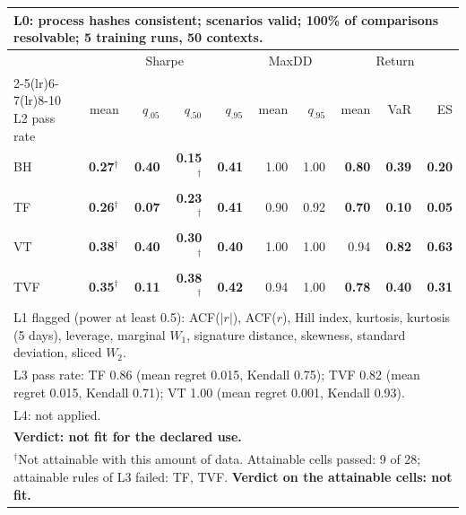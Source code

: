\begin{tabular}{lrrrrrrrrr}
\toprule
\multicolumn{10}{p{13.5cm}}{L0: process hashes consistent; scenarios valid; 100\% of comparisons resolvable; 5 training runs, 50 contexts.} \\
\midrule
 & \multicolumn{4}{c}{Sharpe} & \multicolumn{2}{c}{MaxDD} & \multicolumn{3}{c}{Return} \\
\cmidrule(lr){2-5}\cmidrule(lr){6-7}\cmidrule(lr){8-10}
L2 pass rate & mean & $q_{.05}$ & $q_{.50}$ & $q_{.95}$ & mean & $q_{.95}$ & mean & VaR & ES \\
\midrule
BH & \textbf{0.27}$^{\dagger}$ & \textbf{0.40} & \textbf{0.15}$^{\dagger}$ & \textbf{0.41} & 1.00 & 1.00 & \textbf{0.80} & \textbf{0.39} & \textbf{0.20} \\
TF & \textbf{0.26}$^{\dagger}$ & \textbf{0.07} & \textbf{0.23}$^{\dagger}$ & \textbf{0.41} & 0.90 & 0.92 & \textbf{0.70} & \textbf{0.10} & \textbf{0.05} \\
VT & \textbf{0.38}$^{\dagger}$ & \textbf{0.40} & \textbf{0.30}$^{\dagger}$ & \textbf{0.40} & 1.00 & 1.00 & 0.94 & \textbf{0.82} & \textbf{0.63} \\
TVF & \textbf{0.35}$^{\dagger}$ & \textbf{0.11} & \textbf{0.38}$^{\dagger}$ & \textbf{0.42} & 0.94 & 1.00 & \textbf{0.78} & \textbf{0.40} & \textbf{0.31} \\
\midrule
\multicolumn{10}{p{13.5cm}}{L1 flagged (power at least 0.5): ACF($|r|$), ACF($r$), Hill index, kurtosis, kurtosis (5 days), leverage, marginal $W_1$, signature distance, skewness, standard deviation, sliced $W_2$.} \\
\multicolumn{10}{p{13.5cm}}{L3 pass rate: TF 0.86 (mean regret 0.015, Kendall 0.75); TVF 0.82 (mean regret 0.015, Kendall 0.71); VT 1.00 (mean regret 0.001, Kendall 0.93).} \\
\multicolumn{10}{p{13.5cm}}{L4: not applied.} \\
\multicolumn{10}{p{13.5cm}}{\textbf{Verdict: not fit for the declared use.}} \\
\multicolumn{10}{p{13.5cm}}{$^{\dagger}$Not attainable with this amount of data. Attainable cells passed: 9 of 28; attainable rules of L3 failed: TF, TVF. \textbf{Verdict on the attainable cells: not fit.}} \\
\bottomrule
\end{tabular}
